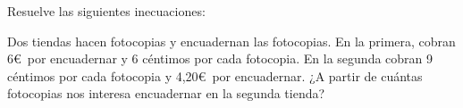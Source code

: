 \documentclass[addpoints,spanish, 12pt,a4paper]{exam}
\begin{document}
\begin{questions}
\question Resuelve las siguientes inecuaciones:
\begin{parts}

\part[2]$ x^2 - x - 6 \geqslant 0  $  
\begin{solution} $ \left(-\infty, -2\right] \cup \left[3, \infty\right)$ \end{solution}

\part[2]$x^{3} - 2 x^{2} - 3 x < 0$  
\begin{solution} $x \left(x - 3\right) \left(x + 1\right)\to\left(-\infty, -1\right) \cup \left(0, 3\right)$ \end{solution}

\part[2]$\dfrac{x^{2} - x}{x + 1}\geqslant 0$  
\begin{solution} $\left(-1, 0\right] \cup \left[1, \infty\right)$ \end{solution}

\part[2]  $\left| {2x - 12} \right| > 2$ 
\begin{solution} $\left(-\infty, 5\right) \cup \left(7, \infty\right) $ \end{solution}

\end{parts}

\addpoints

\question Dos tiendas hacen fotocopias y encuadernan las fotocopias. En la primera, cobran 6\euro\ por encuadernar y 6 céntimos por cada fotocopia. En la segunda cobran 9 céntimos por cada fotocopia y 4,20\euro\ por encuadernar. ¿A partir de cuántas fotocopias nos interesa encuadernar en la segunda tienda?
\begin{parts} 

\end{parts}
\end{questions}
\end{document}
